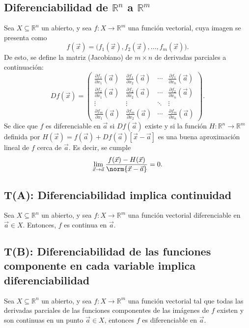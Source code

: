 \documentclass{article}
\begin{document}
\subsection*{Diferenciabilidad de $\mathbb{R}^n$ a $\mathbb{R}^m$}

Sea $X\subseteq\mathbb{R}^n$ un abierto, y sea $f:X\to\mathbb{R}^m$ una función vectorial, cuya imagen se presenta como
$$f(\vec{x})=\big(f_1(\vec{x}),f_2(\vec{x}),\ldots,f_m(\vec{x})\big).$$
De esto, se define la matriz (Jacobiano) de $m\times n$ de derivadas parciales a continuación:
$$Df(\vec{x})=
\begin{pmatrix}
\displaystyle\frac{\partial f_1}{\partial x_1}(\vec{a}) & \displaystyle\frac{\partial f_1}{\partial x_2}(\vec{a}) & \cdots & \displaystyle\frac{\partial f_1}{\partial x_n}(\vec{a})\\
\displaystyle\frac{\partial f_2}{\partial x_1}(\vec{a}) & \displaystyle\frac{\partial f_2}{\partial x_2}(\vec{a}) & \cdots & \displaystyle\frac{\partial f_2}{\partial x_n}(\vec{a})\\
\vdots & \vdots & \ddots & \vdots\\
\displaystyle\frac{\partial f_m}{\partial x_1}(\vec{a}) & \displaystyle\frac{\partial f_m}{\partial x_2}(\vec{a}) & \cdots & \displaystyle\frac{\partial f_m}{\partial x_n}(\vec{a})
\end{pmatrix}.$$
Se dice que $f$ es diferenciable en $\vec{a}$ si $Df(\vec{a})$ existe y si la función $H:\mathbb{R}^n\to\mathbb{R}^m$ definida por $H(\vec{x})=f(\vec{a})+Df(\vec{a})[\vec{x}-\vec{a}]$ es una buena aproximación lineal de $f$ cerca de $\vec{a}$. Es decir, se cumple
$$\lim_{\vec{x}\to\vec{a}}\frac{f(\vec{x})-H(\vec{x})}{\norm{\vec{x}-\vec{a}}}=0.$$

\subsection*{T(A): Diferenciabilidad implica continuidad}

Sea $X\subseteq\mathbb{R}^n$ un abierto, y sea $f:X\to\mathbb{R}^m$ una función vectorial diferenciable en $\vec{a}\in X$. Entonces, $f$ es continua en $\vec{a}$.

\subsection*{T(B): Diferenciabilidad de las funciones componente en cada variable implica diferenciabilidad}

Sea $X\subseteq\mathbb{R}^n$ un abierto, y sea $f:X\to\mathbb{R}^m$ una función vectorial tal que todas las derivadas parciales de las funciones componentes de las imágenes de $f$ existen y son continuas en un punto $\vec{a}\in X$, entonces $f$ es diferenciable en $\vec{a}$.
\end{document}
